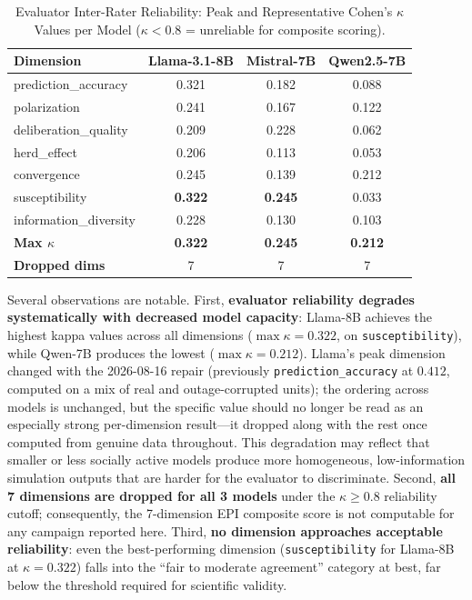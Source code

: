 \documentclass[11pt,journal,onecolumn]{IEEEtran}
\begin{document}
\begin{table}[!htbp]
\centering
\caption{Evaluator Inter-Rater Reliability: Peak and Representative Cohen's $\kappa$ Values per Model ($\kappa < 0.8$ = unreliable for composite scoring).}
\label{tab:kappa_summary}
\small
\begin{tabular}{lccc}
\toprule
\textbf{Dimension} & \textbf{Llama-3.1-8B} & \textbf{Mistral-7B} & \textbf{Qwen2.5-7B} \\
\midrule
prediction\_accuracy    & 0.321 & 0.182 & 0.088 \\
polarization           & 0.241 & 0.167 & 0.122 \\
deliberation\_quality  & 0.209 & 0.228 & 0.062 \\
herd\_effect           & 0.206 & 0.113 & 0.053 \\
convergence            & 0.245 & 0.139 & 0.212 \\
susceptibility         & \textbf{0.322} & \textbf{0.245} & 0.033 \\
information\_diversity & 0.228 & 0.130 & 0.103 \\
\midrule
\textbf{Max $\kappa$}  & \textbf{0.322} & \textbf{0.245} & \textbf{0.212} \\
\textbf{Dropped dims}  & 7 & 7 & 7 \\
\bottomrule
\end{tabular}
\setlength{\tabcolsep}{6pt}
\end{table}

Several observations are notable. First, \textbf{evaluator reliability degrades systematically with decreased model capacity}: Llama-8B achieves the highest kappa values across all dimensions ($\max \kappa = 0.322$, on \texttt{susceptibility}), while Qwen-7B produces the lowest ($\max \kappa = 0.212$). Llama's peak dimension changed with the 2026-08-16 repair (previously \texttt{prediction\_accuracy} at $0.412$, computed on a mix of real and outage-corrupted units); the ordering across models is unchanged, but the specific value should no longer be read as an especially strong per-dimension result---it dropped along with the rest once computed from genuine data throughout. This degradation may reflect that smaller or less socially active models produce more homogeneous, low-information simulation outputs that are harder for the evaluator to discriminate. Second, \textbf{all 7 dimensions are dropped for all 3 models} under the $\kappa \geq 0.8$ reliability cutoff; consequently, the 7-dimension EPI composite score is not computable for any campaign reported here. Third, \textbf{no dimension approaches acceptable reliability}: even the best-performing dimension (\texttt{susceptibility} for Llama-8B at $\kappa = 0.322$) falls into the ``fair to moderate agreement'' category at best, far below the threshold required for scientific validity.
\end{document}

